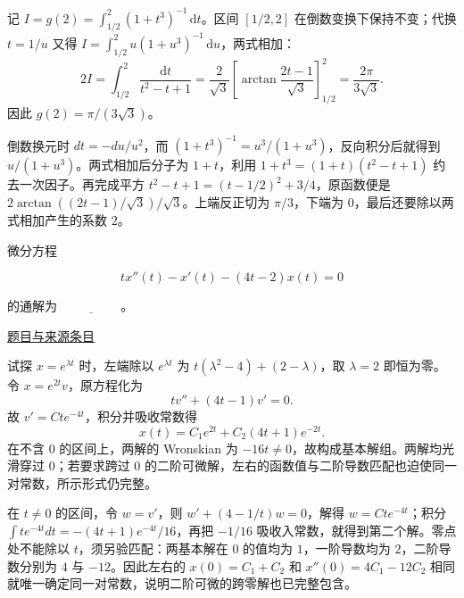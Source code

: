 \documentclass[12pt,fontset=fandol]{ctexart}
\begin{document}
\begin{solve}\label{ans:fin17-high:3}

记 $I=g(2)=\int_{1/2}^2(1+t^3)^{-1}\,\mathrm dt$。区间 $[1/2,2]$ 在倒数变换下保持不变；代换 $t=1/u$ 又得 $I=\int_{1/2}^2u(1+u^3)^{-1}\,\mathrm du$，两式相加：
\[
2I=\int_{1/2}^2\frac{\mathrm dt}{t^2-t+1}
=\frac2{\sqrt3}\left[\arctan\frac{2t-1}{\sqrt3}\right]_{1/2}^2
=\frac{2\pi}{3\sqrt3}.
\]
因此 $\boxed{g(2)=\pi/(3\sqrt3)}$。

倒数换元时 $dt=-du/u^2$，而 $(1+t^3)^{-1}=u^3/(1+u^3)$，反向积分后就得到 $u/(1+u^3)$。两式相加后分子为 $1+t$，利用 $1+t^3=(1+t)(t^2-t+1)$ 约去一次因子。再完成平方 $t^2-t+1=(t-1/2)^2+3/4$，原函数便是 $2\arctan((2t-1)/\sqrt3)/\sqrt3$。上端反正切为 $\pi/3$，下端为 $0$，最后还要除以两式相加产生的系数 $2$。

\end{solve}

\begin{example}[来源序号4]\label{ex:fin17-high:4}\label{pr:fin17-high:4}

微分方程

\[
tx''(t)-x'(t)-(4t-2)x(t)=0
\]

的通解为 $\underline{\hspace{2cm}}$。

\par\href{https://github.com/lzxcr/cmc-mathematics/blob/64916fa1fdbc3e444a652eca204d5669058ee321/src/problems/finals/17/04.md}{题目与来源条目}

\end{example}

\begin{solve}\label{ans:fin17-high:4}

试探 $x=e^{\lambda t}$ 时，左端除以 $e^{\lambda t}$ 为 $t(\lambda^2-4)+(2-\lambda)$，取 $\lambda=2$ 即恒为零。令 $x=e^{2t}v$，原方程化为
\[
tv''+(4t-1)v'=0.
\]
故 $v'=Cte^{-4t}$，积分并吸收常数得
\[
\boxed{x(t)=C_1e^{2t}+C_2(4t+1)e^{-2t}}.
\]
在不含 $0$ 的区间上，两解的 Wronskian 为 $-16t\ne0$，故构成基本解组。两解均光滑穿过 $0$；若要求跨过 $0$ 的二阶可微解，左右的函数值与二阶导数匹配也迫使同一对常数，所示形式仍完整。

在 $t\ne0$ 的区间，令 $w=v'$，则 $w'+(4-1/t)w=0$，解得 $w=Cte^{-4t}$；积分 $\int te^{-4t}dt=-(4t+1)e^{-4t}/16$，再把 $-1/16$ 吸收入常数，就得到第二个解。零点处不能除以 $t$，须另验匹配：两基本解在 $0$ 的值均为 $1$，一阶导数均为 $2$，二阶导数分别为 $4$ 与 $-12$。因此左右的 $x(0)=C_1+C_2$ 和 $x''(0)=4C_1-12C_2$ 相同就唯一确定同一对常数，说明二阶可微的跨零解也已完整包含。

\end{solve}
\end{document}
